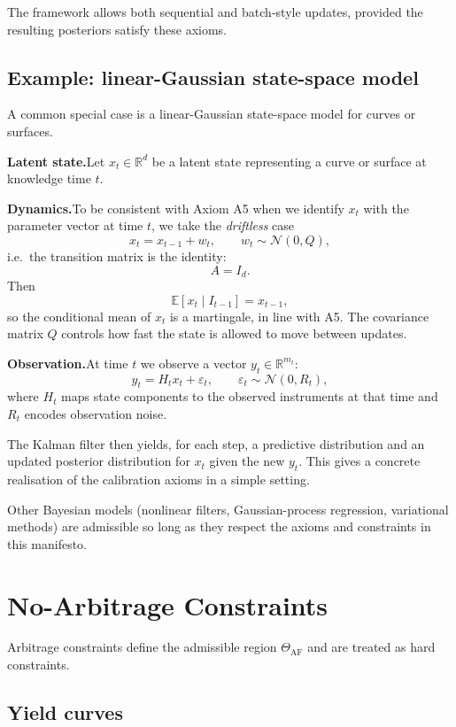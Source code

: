 \documentclass[11pt,a4paper]{article}
\begin{document}
The framework allows both sequential and batch-style updates, provided the resulting posteriors satisfy these axioms.

\subsection{Example: linear-Gaussian state-space model}

A common special case is a linear-Gaussian state-space model for curves or surfaces.

\textbf{Latent state.}\quad Let $x_t \in \mathbb{R}^d$ be a latent state representing a curve or surface at knowledge time $t$.

\textbf{Dynamics.}\quad To be consistent with Axiom A5 when we identify $x_t$ with the parameter vector at time $t$, we take the \textit{driftless} case
\[
    x_t = x_{t-1} + w_t, \qquad w_t \sim \mathcal{N}(0, Q),
\]
i.e.\ the transition matrix is the identity:
\[
    A = I_d.
\]
Then
\[
    \mathbb{E}[x_t \mid I_{t-1}] = x_{t-1},
\]
so the conditional mean of $x_t$ is a martingale, in line with A5. The covariance matrix $Q$ controls how fast the state is allowed to move between updates.

\textbf{Observation.}\quad At time $t$ we observe a vector $y_t \in \mathbb{R}^{m_t}$:
\[
    y_t = H_t x_t + \varepsilon_t, \qquad \varepsilon_t \sim \mathcal{N}(0, R_t),
\]
where $H_t$ maps state components to the observed instruments at that time and $R_t$ encodes observation noise.

The Kalman filter then yields, for each step, a predictive distribution and an updated posterior distribution for $x_t$ given the new $y_t$. This gives a concrete realisation of the calibration axioms in a simple setting.

Other Bayesian models (nonlinear filters, Gaussian-process regression, variational methods) are admissible so long as they respect the axioms and constraints in this manifesto.

\section{No-Arbitrage Constraints}
\label{sec:noarb}

Arbitrage constraints define the admissible region $\Theta_{\text{AF}}$ and are treated as hard constraints.

\subsection{Yield curves}
\end{document}
